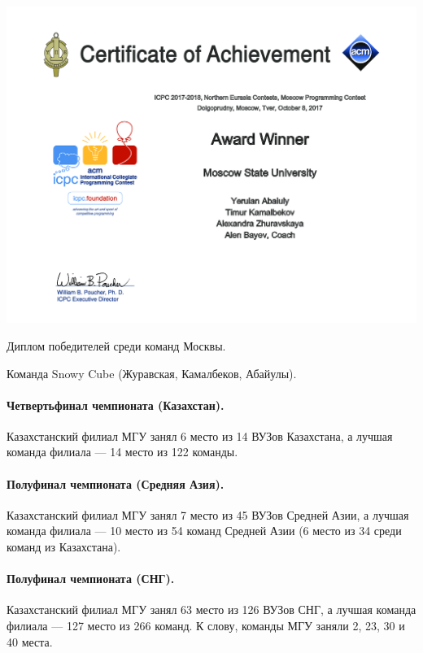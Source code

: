 \newpage
\mbox{}
\vfill
\begin{center}
\includegraphics[width=0.9\linewidth]{diploma/2017-moscow}

Диплом победителей среди команд Москвы.

Команда Snowy Cube (Журавская, Камалбеков, Абайулы).
\end{center}
\vfill
\mbox{}
\newpage

\paragraph{Четвертьфинал чемпионата (Казахстан).} Казахстанский филиал МГУ занял 6 место из 14 ВУЗов Казахстана, а лучшая команда филиала --- 14 место из 122 команды.

\paragraph{Полуфинал чемпионата (Средняя Азия).} Казахстанский филиал МГУ занял 7 место из 45 ВУЗов Средней Азии, а лучшая команда филиала --- 10 место из 54 команд Средней Азии (6 место из 34 среди команд из Казахстана).

\paragraph{Полуфинал чемпионата (СНГ).} Казахстанский филиал МГУ занял 63 место из 126 ВУЗов СНГ, а лучшая команда филиала --- 127 место из 266 команд. К слову, команды МГУ заняли 2, 23, 30 и 40 места.

